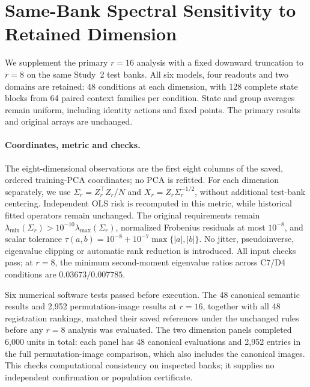 \section{Same-Bank Spectral Sensitivity to Retained Dimension}
\label{app:spectral-dimension-sensitivity}
We supplement the primary $r=16$ analysis with a fixed downward truncation to $r=8$ on the same Study~2 test banks. All six models, four readouts and two domains are retained: 48 conditions at each dimension, with 128 complete state blocks from 64 paired context families per condition. State and group averages remain uniform, including identity actions and fixed points. The primary results and original arrays are unchanged.

\paragraph{Coordinates, metric and checks.}
The eight-dimensional observations are the first eight columns of the saved, ordered training-PCA coordinates; no PCA is refitted. For each dimension separately, we use $\Sigma_r=Z_r^\top Z_r/N$ and $X_r=Z_r\Sigma_r^{-1/2}$, without additional test-bank centering. Independent OLS risk is recomputed in this metric, while historical fitted operators remain unchanged. The original requirements remain $\lambda_{\min}(\Sigma_r)>10^{-10}\lambda_{\max}(\Sigma_r)$, normalized Frobenius residuals at most $10^{-8}$, and scalar tolerance $\tau(a,b)=10^{-8}+10^{-7}\max\{|a|,|b|\}$. No jitter, pseudoinverse, eigenvalue clipping or automatic rank reduction is introduced. All input checks pass; at $r=8$, the minimum second-moment eigenvalue ratios across C7/D4 conditions are $0.03673/0.007785$.

Six numerical software tests passed before execution. The 48 canonical semantic results and 2,952 permutation-image results at $r=16$, together with all 48 registration rankings, matched their saved references under the unchanged rules before any $r=8$ analysis was evaluated. The two dimension panels completed 6,000 units in total: each panel has 48 canonical evaluations and 2,952 entries in the full permutation-image comparison, which also includes the canonical images. This checks computational consistency on inspected banks; it supplies no independent confirmation or population certificate.


\FloatBarrier

